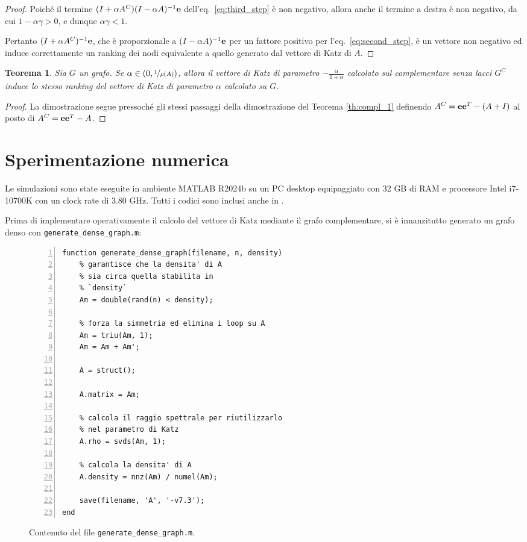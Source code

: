 \documentclass[a4paper]{article}
\newcommand{\evec}{{\bf e}}
\newtheorem{theorem}{Teorema}
\begin{document}
\begin{proof}
    Poiché il termine $(I + \alpha A^C) (I-\alpha A)^{-1} \evec$ dell'eq.~\eqref{eq:third_step} è non negativo, allora
    anche il termine a destra è non negativo, da cui
    $1 - \alpha \gamma > 0$, e dunque $\alpha \gamma < 1$.

    Pertanto $(I + \alpha A^C)^{-1} \evec$, che è proporzionale a $(I-\alpha A)^{-1} \evec$ per un fattore positivo per
    l'eq.~\eqref{eq:second_step}, è un vettore non negativo ed induce correttamente un ranking dei nodi equivalente
    a quello generato dal vettore di Katz di $A$.
\end{proof}

\begin{theorem}
    \label{th:compl_2}
    Sia $G$ un grafo. Se $\alpha \in (0, \nicefrac{1}{\rho(A)})$, allora il vettore di Katz di parametro $-\frac{\alpha}{1+\alpha}$ calcolato sul complementare senza lacci $G^C$
    induce lo stesso ranking del vettore di Katz di parametro $\alpha$ calcolato su $G$.
\end{theorem}

\begin{proof}
    La dimostrazione segue pressoché gli stessi passaggi della dimostrazione del Teorema \ref{th:compl_1} definendo
    $A^C = \evec \evec^T - (A+I)$ al posto di $A^C = \evec \evec^T - A$.
\end{proof}

\section{Sperimentazione numerica}

Le simulazioni sono state eseguite in ambiente MATLAB R2024b su un PC desktop equipaggiato con 32 GB di RAM e
processore Intel i7-10700K con un clock rate di 3.80 GHz. Tutti i codici sono inclusi anche in \cite{hearotCode}.

Prima di implementare operativamente il calcolo del vettore di Katz mediante il grafo complementare, si è innanzitutto generato
un grafo denso con \texttt{generate\_dense\_graph.m}:

\begin{figure}[h]
    \centering
    \begin{lstlisting}[style=Matlab-editor, frame=single, numbers=left]
function generate_dense_graph(filename, n, density)
    % garantisce che la densita' di A
    % sia circa quella stabilita in
    % `density`
    Am = double(rand(n) < density);
    
    % forza la simmetria ed elimina i loop su A
    Am = triu(Am, 1);
    Am = Am + Am';
    
    A = struct();
    
    A.matrix = Am;
    
    % calcola il raggio spettrale per riutilizzarlo
    % nel parametro di Katz
    A.rho = svds(Am, 1);
    
    % calcola la densita' di A
    A.density = nnz(Am) / numel(Am);
    
    save(filename, 'A', '-v7.3');
end            
    \end{lstlisting}
    \vskip -0.1in
    \caption{Contenuto del file \texttt{generate\_dense\_graph.m}.}
\end{figure}

\printbibliography
\end{document}
